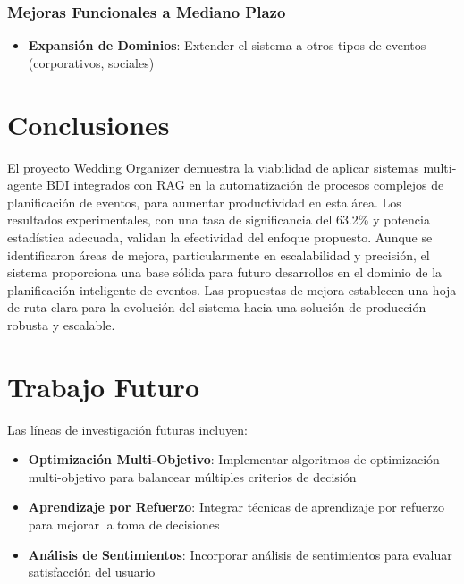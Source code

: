 \documentclass[runningheads,a4paper]{llncs}
\begin{document}
\subsubsection{Mejoras Funcionales a Mediano Plazo}
\begin{itemize}
    \item \textbf{Expansión de Dominios}: Extender el sistema a otros tipos de eventos (corporativos, sociales)
\end{itemize}


\section{Conclusiones}

El proyecto Wedding Organizer demuestra la viabilidad de aplicar sistemas multi-agente BDI integrados con RAG en la automatización de procesos complejos de planificación de eventos, para aumentar productividad en esta área. Los resultados experimentales, con una tasa de significancia del 63.2\% y potencia estadística adecuada, validan la efectividad del enfoque propuesto.
Aunque se identificaron áreas de mejora, particularmente en escalabilidad y precisión, el sistema proporciona una base sólida para futuro desarrollos en el dominio de la planificación inteligente de eventos. Las propuestas de mejora establecen una hoja de ruta clara para la evolución del sistema hacia una solución de producción robusta y escalable.

\section{Trabajo Futuro}

Las líneas de investigación futuras incluyen:

\begin{itemize}
    \item \textbf{Optimización Multi-Objetivo}: Implementar algoritmos de optimización multi-objetivo para balancear múltiples criterios de decisión
    \item \textbf{Aprendizaje por Refuerzo}: Integrar técnicas de aprendizaje por refuerzo para mejorar la toma de decisiones
    \item \textbf{Análisis de Sentimientos}: Incorporar análisis de sentimientos para evaluar satisfacción del usuario
\end{itemize}
\end{document}
